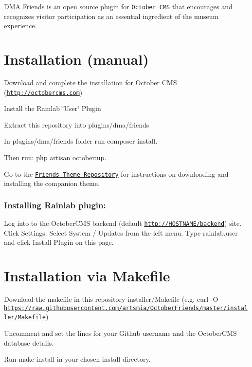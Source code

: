 \hyperlink{namespaceDMA}{D\+M\+A} Friends is an open source plugin for \href{http://octobercms.com}{\tt October C\+M\+S} that encourages and recognizes visitor participation as an essential ingredient of the museum experience.

\section*{Installation (manual)}


\begin{DoxyItemize}
\item Download and complete the installation for October C\+M\+S (\href{http://octobercms.com}{\tt http\+://octobercms.\+com})
\item Install the Rainlab \char`\"{}\+User\char`\"{} Plugin
\item Extract this repository into plugins/dma/friends
\item In plugins/dma/friends folder run {\ttfamily composer install}.
\item Then run\+: {\ttfamily php artisan october\+:up}.
\item Go to the \href{https://github.com/DallasMuseumArt/OctoberFriendsTheme}{\tt Friends Theme Repository} for instructions on downloading and installing the companion theme.
\end{DoxyItemize}

\subsubsection*{Installing Rainlab plugin\+:}

Log into to the October\+C\+M\+S backend (default \href{http://HOSTNAME/backend}{\tt http\+://\+H\+O\+S\+T\+N\+A\+M\+E/backend}) site. Click Settings. Select System / Updates from the left menu. Type rainlab.\+user and click Install Plugin on this page.

\section*{Installation via Makefile}


\begin{DoxyItemize}
\item Download the makefile in this repository installer/\+Makefile (e.\+g. curl -\/\+O \href{https://raw.githubusercontent.com/artsmia/OctoberFriends/master/installer/Makefile}{\tt https\+://raw.\+githubusercontent.\+com/artsmia/\+October\+Friends/master/installer/\+Makefile})
\item Uncomment and set the lines for your Github username and the October\+C\+M\+S database details.
\item Run {\ttfamily make install} in your chosen install directory.
\end{DoxyItemize}

